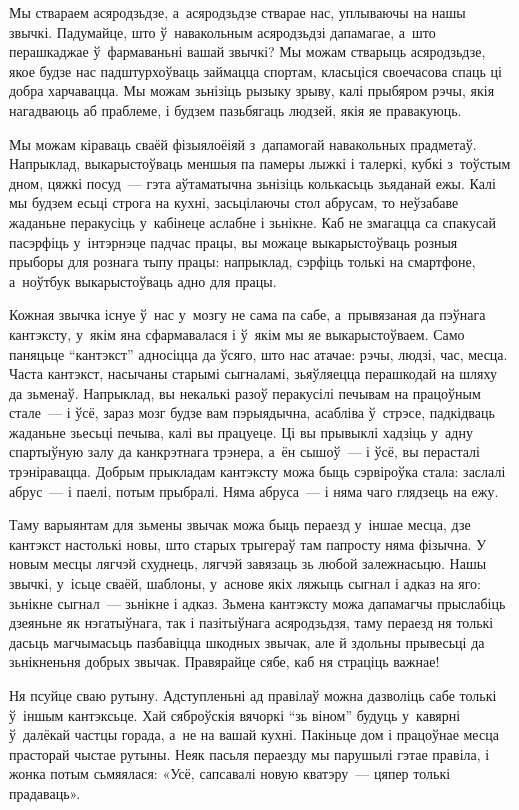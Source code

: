 Мы ствараем асяродзьдзе, а~асяродзьдзе стварае нас, уплываючы на нашы звычкі. Падумайце, што ў~навакольным асяродзьдзі дапамагае, а~што перашкаджае ў~фармаваньні вашай звычкі? Мы можам стварыць асяродзьдзе, якое будзе нас падштурхоўваць займацца спортам, класьціся своечасова спаць ці добра харчавацца. Мы можам зьнізіць рызыку зрыву, калі прыбяром рэчы, якія нагадваюць аб праблеме, і будзем пазьбягаць людзей, якія яе правакуюць.

Мы можам кіраваць сваёй фізыялоёіяй з~дапамогай навакольных прадметаў. Напрыклад, выкарыстоўваць меншыя па памеры лыжкі і талеркі, кубкі з~тоўстым дном, цяжкі посуд~--- гэта аўтаматычна зьнізіць колькасьць зьяданай ежы. Калі мы будзем есьці строга на кухні, засьцілаючы стол абрусам, то неўзабаве жаданьне перакусіць у~кабінеце аслабне і зьнікне. Каб не змагацца са спакусай пасэрфіць у~інтэрнэце падчас працы, вы можаце выкарыстоўваць розныя прыборы для рознага тыпу працы: напрыклад, сэрфіць толькі на смартфоне, а~ноўтбук выкарыстоўваць адно для працы.

Кожная звычка існуе ў~нас у~мозгу не сама па сабе, а~прывязаная да пэўнага кантэксту, у~якім яна сфармавалася і ў~якім мы яе выкарыстоўваем. Само паняцьце “кантэкст” адносіцца да ўсяго, што нас атачае: рэчы, людзі, час, месца. Часта кантэкст, насычаны старымі сыгналамі, зьяўляецца перашкодай на шляху да зьменаў. Напрыклад, вы некалькі разоў перакусілі печывам на працоўным стале~--- і ўсё, зараз мозг будзе вам пэрыядычна, асабліва ў~стрэсе, падкідваць жаданьне зьесьці печыва, калі вы працуеце. Ці вы прывыклі хадзіць у~адну спартыўную залу да канкрэтнага трэнера, а~ён сышоў~--- і ўсё, вы перасталі трэніравацца. Добрым прыкладам кантэксту можа быць сэрвіроўка стала: заслалі абрус~--- і паелі, потым прыбралі. Няма абруса~--- і няма чаго глядзець на ежу. 

Таму варыянтам для зьмены звычак можа быць пераезд у~іншае месца, дзе кантэкст настолькі новы, што старых трыгераў там папросту няма фізычна. У новым месцы лягчэй схуднець, лягчэй завязаць зь любой залежнасьцю. Нашы звычкі, у~ісьце сваёй, шаблоны, у~аснове якіх ляжыць сыгнал і адказ на яго: зьнікне сыгнал~--- зьнікне і адказ. Зьмена кантэксту можа дапамагчы прыслабіць дзеяньне як нэгатыўнага, так і пазітыўнага асяродзьдзя, таму пераезд ня толькі дасьць магчымасьць пазбавіцца шкодных звычак, але й здольны прывесьці да зьнікненьня добрых звычак. Правярайце сябе, каб ня страціць важнае! 

Ня псуйце сваю рутыну. Адступленьні ад правілаў можна дазволіць сабе толькі ў~іншым кантэксьце. Хай сяброўскія вячоркі ``зь віном'' будуць у~кавярні ў~далёкай частцы горада, а~не на вашай кухні. Пакіньце дом і працоўнае месца прасторай чыстае рутыны. Неяк пасьля пераезду мы парушылі гэтае правіла, і жонка потым сьмяялася: «Усё, сапсавалі новую кватэру~--- цяпер толькі прадаваць».

